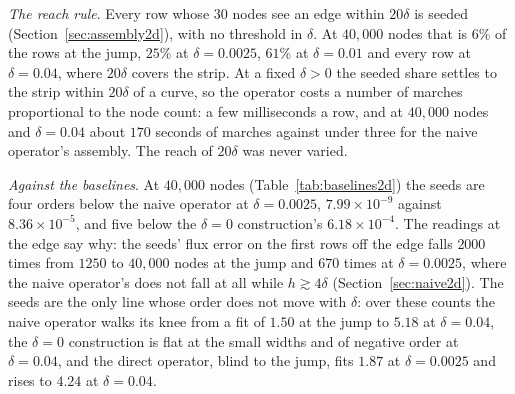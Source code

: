 \documentclass[11pt]{amsart}
\theoremstyle{definition}
\theoremstyle{remark}
\newcommand{\para}[1]{\par\smallskip\noindent\textit{#1}.\enspace}
\newcommand{\sci}[2]{#1 \times 10^{#2}}
\begin{document}
\begin{table}
  \centering
  \caption{The seeds on case 1: RMS error at each count and width, at
  equilibrium and for the parabolic problem at $t = 0.1$; max/min, the
  largest of the five widths' errors over the smallest at one count; fit,
  the least-squares order over $1250$ to $40{,}000$ nodes, and at the jump
  over all eight counts.}
  \label{tab:seeds2d}
  \footnotesize
  
\end{table}

\para{The reach rule}
Every row whose $30$ nodes see an edge within $20\delta$ is seeded
(Section~\ref{sec:assembly2d}), with no threshold in $\delta$. At
$40{,}000$ nodes that is $6\%$ of the rows at the jump, $25\%$ at
$\delta = 0.0025$, $61\%$ at $\delta = 0.01$ and every row at
$\delta = 0.04$, where $20\delta$ covers the strip. At a fixed $\delta > 0$
the seeded share settles to the strip within $20\delta$ of a curve, so the
operator costs a number of marches proportional to the node count: a few
milliseconds a row, and at $40{,}000$ nodes and $\delta = 0.04$ about
$170$ seconds of marches against under three for the naive operator's
assembly. The reach of $20\delta$ was never varied.

\para{Against the baselines}
At $40{,}000$ nodes (Table~\ref{tab:baselines2d}) the seeds are four orders
below the naive operator at $\delta = 0.0025$, $\sci{7.99}{-9}$ against
$\sci{8.36}{-5}$, and five below the $\delta = 0$ construction's $\sci{6.18}{-4}$. The
readings at the edge say why: the seeds' flux error on the first rows off the
edge falls $2000$ times from $1250$ to $40{,}000$ nodes at the jump and $670$
times at $\delta = 0.0025$, where the naive operator's does not fall at all
while $h \gtrsim 4\delta$ (Section~\ref{sec:naive2d}). The seeds are the only
line whose order does not move with $\delta$: over these counts the naive
operator walks its knee from a fit of $1.50$ at the jump to $5.18$ at
$\delta = 0.04$, the $\delta = 0$ construction is flat at the small widths and of negative
order at $\delta = 0.04$, and the direct operator, blind to the jump, fits
$1.87$ at $\delta = 0.0025$ and rises to $4.24$ at $\delta = 0.04$.

\begin{table}
  \centering
  \caption{Every operator on case 1 at $40{,}000$ nodes ($h = 0.0053$), RMS
  error at equilibrium. Direct, 30/4: the direct operator on the seeds' own
  stencil groups; plain: the seed rows with plain Gaussians.}
  \label{tab:baselines2d}
  \footnotesize
  
\end{table}
\end{document}
